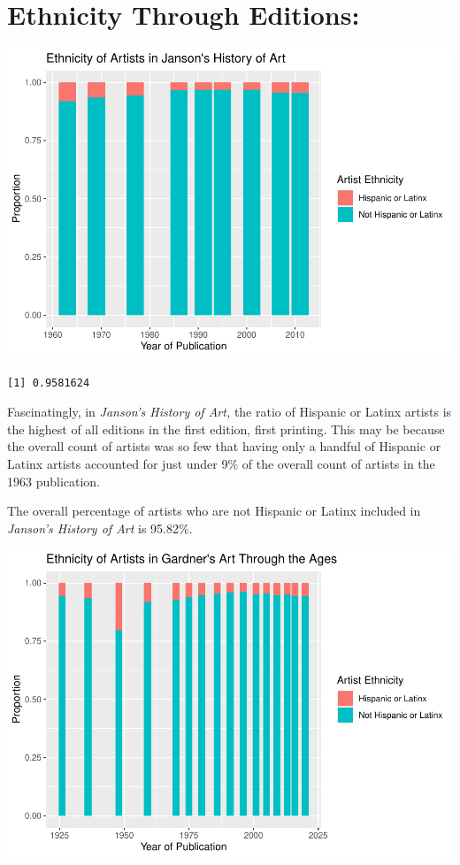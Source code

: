 \documentclass[
  letterpaper,
  DIV=11,
  numbers=noendperiod]{scrreprt}
\begin{document}
\hypertarget{ethnicity-through-editions}{%
\section{\texorpdfstring{\textbf{Ethnicity Through
Editions:}}{Ethnicity Through Editions:}}\label{ethnicity-through-editions}}

\includegraphics{Chapter1/Chapter1_files/figure-pdf/jansonethnicitythroughtime-1.pdf}

\begin{verbatim}
[1] 0.9581624
\end{verbatim}

Fascinatingly, in \emph{Janson's History of Art,} the ratio of Hispanic
or Latinx artists is the highest of all editions in the first edition,
first printing. This may be because the overall count of artists was so
few that having only a handful of Hispanic or Latinx artists accounted
for just under 9\% of the overall count of artists in the 1963
publication.

The overall percentage of artists who are not Hispanic or Latinx
included in \emph{Janson's History of Art} is 95.82\%.

\includegraphics{Chapter1/Chapter1_files/figure-pdf/gardnethnicitythroughtime-1.pdf}
\end{document}
